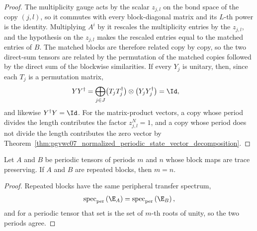 \begin{proof}\leanok
    The multiplicity gauge acts by the scalar $z_{j,l}$ on the bond space of
    the copy $(j,l)$, so it commutes with every block-diagonal matrix and its
    $L$-th power is the identity. Multiplying $A^i$ by it rescales the
    multiplicity entries by the $z_{j,l}$, and the hypothesis on the
    $z_{j,l}$ makes the rescaled entries equal to the matched entries of $B$.
    The matched blocks are therefore related copy by copy, so the two
    direct-sum tensors are related by the permutation of the matched copies
    followed by the direct sum of the blockwise similarities. If every $Y_j$
    is unitary, then, since each $T_j$ is a permutation matrix,
    \begin{align}
        YY^\dagger & =\bigoplus_{j\in J}\bigl(T_jT_j^\dagger\bigr)\otimes\bigl(Y_jY_j^\dagger\bigr)=\Id,
        \notag
    \end{align}
    and likewise $Y^\dagger Y=\Id$. For the
    matrix-product vectors, a copy whose period divides the length contributes
    the factor $z_{j,l}^N=1$, and a copy whose period does not divide the
    length contributes the zero vector by
    Theorem~\ref{thm:pgvwc07_normalized_periodic_state_vector_decomposition}.
\end{proof}

\begin{lemma}%
    \label{thm:periodic_repeated_blocks_period_eq_tp}
    \leanok
    Let $A$ and $B$ be periodic tensors of periods $m$ and $n$ whose block maps
    are trace preserving. If $A$ and $B$ are repeated blocks, then $m=n$.
\end{lemma}

\begin{proof}\leanok
    Repeated blocks have the same peripheral transfer spectrum,
    \begin{align}
        \operatorname{spec}_{\text{per}}\left(\E_{A}\right)
        =\operatorname{spec}_{\text{per}}\left(\E_{B}\right),
        \notag
    \end{align}
    and for a periodic tensor that set is the set of $m$-th roots of unity, so
    the two periods agree.
\end{proof}

